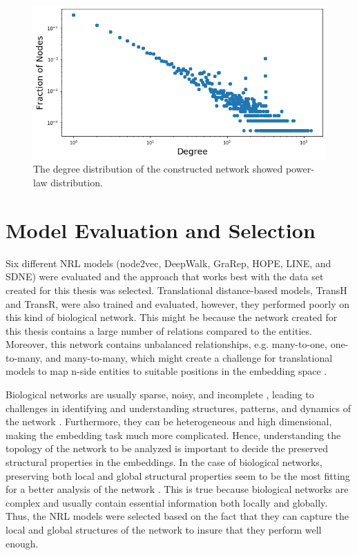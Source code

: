 \begin{figure}[h!]
    \centering
    \includegraphics[scale=0.5]
    {figures/degree_distribution.png}
    \caption[Degree distribution of network]{\label{fig:degree_distribution}The degree distribution of the constructed network showed power-law distribution.}
\end{figure}

\section{Model Evaluation and Selection}
Six different \ac{NRL} models (node2vec, DeepWalk, \ac{GraRep}, \ac{HOPE}, \ac{LINE}, and \ac{SDNE}) were evaluated and the approach that works best with the data set created for this thesis was selected.
Translational distance-based models, TransH and TransR, were also trained and evaluated, however, they performed poorly on this kind of biological network.
This might be because the network created for this thesis contains a large number of relations compared to the entities.
Moreover, this network contains unbalanced relationships, e.g. many-to-one, one-to-many, and many-to-many, which might create a challenge for translational models to map n-side entities to suitable positions in the embedding space \cite{liang_predicting_2019}.

Biological networks are usually sparse, noisy, and incomplete \cite{nickel_review_2016}, leading to challenges in identifying and understanding structures, patterns, and dynamics of the network \cite{wang_unsupervised_2016}.
Furthermore, they can be heterogeneous and high dimensional, making the embedding task much more complicated.
Hence, understanding the topology of the network to be analyzed is important to decide the preserved structural properties in the embeddings.
In the case of biological networks, preserving both local and global structural properties seem to be the most fitting for a better analysis of the network \cite{su_network_2018}.
This is true because biological networks are complex and usually contain essential information both locally and globally.
Thus, the \ac{NRL} models were selected based on the fact that they can capture the local and global structures of the network to insure that they perform well enough.

